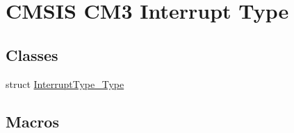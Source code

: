 \hypertarget{group___c_m_s_i_s___c_m3___interrupt_type}{}\section{C\+M\+S\+IS C\+M3 Interrupt Type}
\label{group___c_m_s_i_s___c_m3___interrupt_type}
\subsection*{Classes}
\begin{DoxyCompactItemize}
\item 
struct \hyperlink{struct_interrupt_type___type}{Interrupt\+Type\+\_\+\+Type}
\end{DoxyCompactItemize}
\subsection*{Macros}
